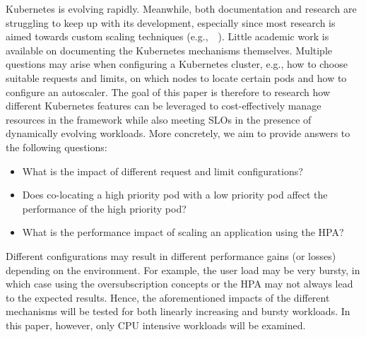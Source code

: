 Kubernetes is evolving rapidly. Meanwhile, both documentation and research are struggling to keep up with its development, especially since most research is aimed towards custom scaling techniques (e.g.,~\citep{hyscale}~\citep{caravel}). Little academic work is available on documenting the Kubernetes mechanisms themselves. Multiple questions may arise when configuring a Kubernetes cluster, e.g., how to choose suitable requests and limits, on which nodes to locate certain pods and how to configure an autoscaler. 
The goal of this paper is therefore to research how different Kubernetes features can be leveraged to cost-effectively manage resources in the framework while also meeting SLOs in the presence of dynamically evolving workloads. More concretely, we aim to provide answers to the following questions:
\begin{itemize}[noitemsep]
    \itemsep0em 
    \item What is the impact of different request and limit configurations?
    \item Does co-locating a high priority pod with a low priority pod affect the performance of the high priority pod?
    \item What is the performance impact of scaling an application using the HPA?
\end{itemize}

Different configurations may result in different performance gains (or losses) depending on the environment. For example, the user load may be very bursty, in which case using the oversubscription concepts or the HPA may not always lead to the expected results. Hence, the aforementioned impacts of the different mechanisms will be tested for both linearly increasing and bursty workloads. In this paper, however, only CPU intensive workloads will be examined. 


